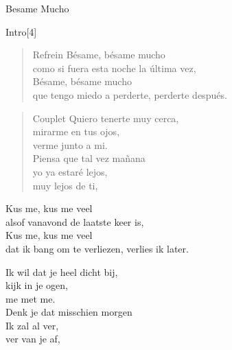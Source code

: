 
\begin{song}[bolero]{Besame Mucho}
\begin{instrumental}{Intro}[4]
\end{instrumental}

\begin{verse}{Refrein}
Bésame, bésame mucho\\
como si fuera esta noche la última vez,\\	
Bésame, bésame mucho\\
que tengo miedo a perderte, perderte después.
\end{verse}
\begin{verse}{Couplet}
Quiero tenerte muy cerca,\\
mirarme en tus ojos, \\
verme junto a mi.\\
Piensa que tal vez mañana \\
yo ya estaré lejos,\\
muy lejos de ti,
\end{verse}

\end{song}

\clearpage
\begin{translation}
Kus me, kus me veel\\
alsof vanavond de laatste keer is,\\
Kus me, kus me veel\\
dat ik bang om te verliezen, verlies ik later.\vspace{\wlskip}

Ik wil dat je heel dicht bij,\\
kijk in je ogen,\\
me met me.\\
Denk je dat misschien morgen\\
Ik zal al ver,\\
ver van je af,\\
\end{translation}
